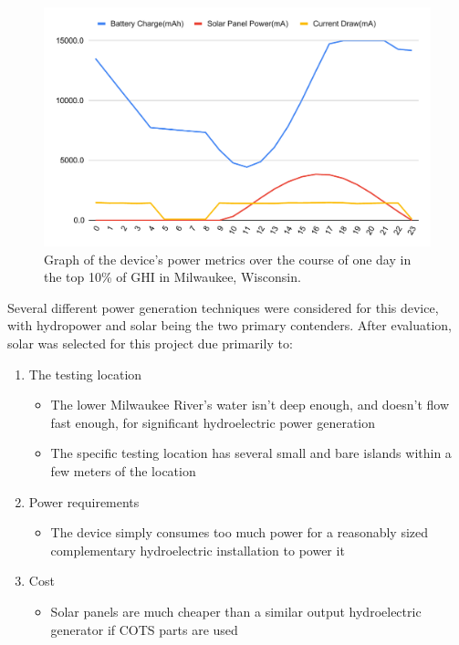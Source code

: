 \documentclass[fleqn,10pt]{SelfArx} %
\begin{document}
	\begin{figure}[h]
		\centering
		\includegraphics[width=1\linewidth]{Figures/HiDay}
		\caption[Power Consumption Graph]{Graph of the device's power metrics over the course of one day in the top 10\% of GHI in Milwaukee, Wisconsin.}
		\label{fig:topPowerGen}
	\end{figure} 
	Several different power generation techniques were considered for this device, with hydropower and solar being the two primary contenders. After evaluation, solar was selected for this project due primarily to:
	\begin{enumerate}
		\item The testing location
		\begin{itemize}
			\item The lower Milwaukee River's water isn't deep enough, and doesn't flow fast enough, for significant hydroelectric power generation
			\item The specific testing location has several small and bare islands within a few meters of the location
		\end{itemize}
		\item Power requirements
		\begin{itemize}
			\item The device simply consumes too much power for a reasonably sized complementary hydroelectric installation to power it
		\end{itemize}
		\item Cost
		\begin{itemize}
			\item Solar panels are much cheaper than a similar output hydroelectric generator if COTS parts are used
		\end{itemize}
	\end{enumerate}
	
\end{document}
